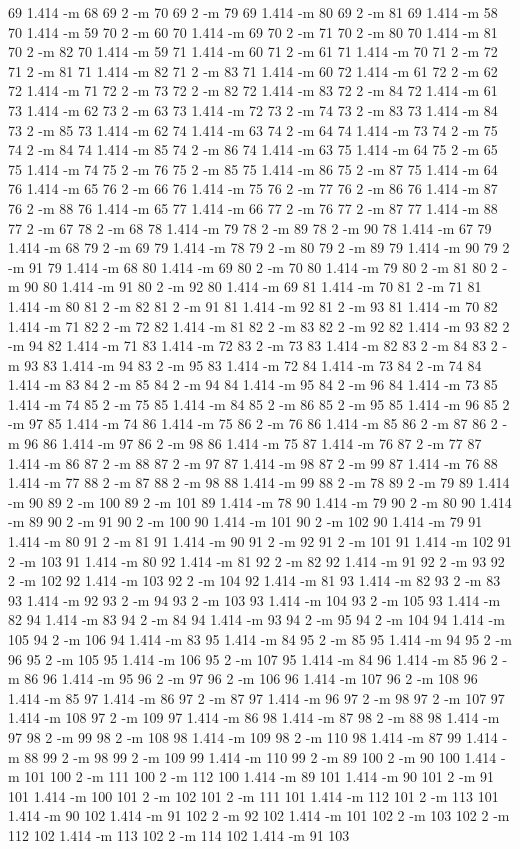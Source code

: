 \documentclass[12pt]{article}
\begin{document}
69 1.414 -m 68 69 2 -m 70 69 2 -m 79 69 1.414 -m 80 69 2 -m 81 69 1.414 -m 58 70 1.414 -m 59 70 2 -m 60 70 1.414 -m 69 70 2 -m 71 70 2 -m 80 70 1.414 -m 81 70 2 -m 82 70 1.414 -m 59 71 1.414 -m 60 71 2 -m 61 71 1.414 -m 70 71 2 -m 72 71 2 -m 81 71 1.414 -m 82 71 2 -m 83 71 1.414 -m 60 72 1.414 -m 61 72 2 -m 62 72 1.414 -m 71 72 2 -m 73 72 2 -m 82 72 1.414 -m 83 72 2 -m 84 72 1.414 -m 61 73 1.414 -m 62 73 2 -m 63 73 1.414 -m 72 73 2 -m 74 73 2 -m 83 73 1.414 -m 84 73 2 -m 85 73 1.414 -m 62 74 1.414 -m 63 74 2 -m 64 74 1.414 -m 73 74 2 -m 75 74 2 -m 84 74 1.414 -m 85 74 2 -m 86 74 1.414 -m 63 75 1.414 -m 64 75 2 -m 65 75 1.414 -m 74 75 2 -m 76 75 2 -m 85 75 1.414 -m 86 75 2 -m 87 75 1.414 -m 64 76 1.414 -m 65 76 2 -m 66 76 1.414 -m 75 76 2 -m 77 76 2 -m 86 76 1.414 -m 87 76 2 -m 88 76 1.414 -m 65 77 1.414 -m 66 77 2 -m 76 77 2 -m 87 77 1.414 -m 88 77 2 -m 67 78 2 -m 68 78 1.414 -m 79 78 2 -m 89 78 2 -m 90 78 1.414 -m 67 79 1.414 -m 68 79 2 -m 69 79 1.414 -m 78 79 2 -m 80 79 2 -m 89 79 1.414 -m 90 79 2 -m 91 79 1.414 -m 68 80 1.414 -m 69 80 2 -m 70 80 1.414 -m 79 80 2 -m 81 80 2 -m 90 80 1.414 -m 91 80 2 -m 92 80 1.414 -m 69 81 1.414 -m 70 81 2 -m 71 81 1.414 -m 80 81 2 -m 82 81 2 -m 91 81 1.414 -m 92 81 2 -m 93 81 1.414 -m 70 82 1.414 -m 71 82 2 -m 72 82 1.414 -m 81 82 2 -m 83 82 2 -m 92 82 1.414 -m 93 82 2 -m 94 82 1.414 -m 71 83 1.414 -m 72 83 2 -m 73 83 1.414 -m 82 83 2 -m 84 83 2 -m 93 83 1.414 -m 94 83 2 -m 95 83 1.414 -m 72 84 1.414 -m 73 84 2 -m 74 84 1.414 -m 83 84 2 -m 85 84 2 -m 94 84 1.414 -m 95 84 2 -m 96 84 1.414 -m 73 85 1.414 -m 74 85 2 -m 75 85 1.414 -m 84 85 2 -m 86 85 2 -m 95 85 1.414 -m 96 85 2 -m 97 85 1.414 -m 74 86 1.414 -m 75 86 2 -m 76 86 1.414 -m 85 86 2 -m 87 86 2 -m 96 86 1.414 -m 97 86 2 -m 98 86 1.414 -m 75 87 1.414 -m 76 87 2 -m 77 87 1.414 -m 86 87 2 -m 88 87 2 -m 97 87 1.414 -m 98 87 2 -m 99 87 1.414 -m 76 88 1.414 -m 77 88 2 -m 87 88 2 -m 98 88 1.414 -m 99 88 2 -m 78 89 2 -m 79 89 1.414 -m 90 89 2 -m 100 89 2 -m 101 89 1.414 -m 78 90 1.414 -m 79 90 2 -m 80 90 1.414 -m 89 90 2 -m 91 90 2 -m 100 90 1.414 -m 101 90 2 -m 102 90 1.414 -m 79 91 1.414 -m 80 91 2 -m 81 91 1.414 -m 90 91 2 -m 92 91 2 -m 101 91 1.414 -m 102 91 2 -m 103 91 1.414 -m 80 92 1.414 -m 81 92 2 -m 82 92 1.414 -m 91 92 2 -m 93 92 2 -m 102 92 1.414 -m 103 92 2 -m 104 92 1.414 -m 81 93 1.414 -m 82 93 2 -m 83 93 1.414 -m 92 93 2 -m 94 93 2 -m 103 93 1.414 -m 104 93 2 -m 105 93 1.414 -m 82 94 1.414 -m 83 94 2 -m 84 94 1.414 -m 93 94 2 -m 95 94 2 -m 104 94 1.414 -m 105 94 2 -m 106 94 1.414 -m 83 95 1.414 -m 84 95 2 -m 85 95 1.414 -m 94 95 2 -m 96 95 2 -m 105 95 1.414 -m 106 95 2 -m 107 95 1.414 -m 84 96 1.414 -m 85 96 2 -m 86 96 1.414 -m 95 96 2 -m 97 96 2 -m 106 96 1.414 -m 107 96 2 -m 108 96 1.414 -m 85 97 1.414 -m 86 97 2 -m 87 97 1.414 -m 96 97 2 -m 98 97 2 -m 107 97 1.414 -m 108 97 2 -m 109 97 1.414 -m 86 98 1.414 -m 87 98 2 -m 88 98 1.414 -m 97 98 2 -m 99 98 2 -m 108 98 1.414 -m 109 98 2 -m 110 98 1.414 -m 87 99 1.414 -m 88 99 2 -m 98 99 2 -m 109 99 1.414 -m 110 99 2 -m 89 100 2 -m 90 100 1.414 -m 101 100 2 -m 111 100 2 -m 112 100 1.414 -m 89 101 1.414 -m 90 101 2 -m 91 101 1.414 -m 100 101 2 -m 102 101 2 -m 111 101 1.414 -m 112 101 2 -m 113 101 1.414 -m 90 102 1.414 -m 91 102 2 -m 92 102 1.414 -m 101 102 2 -m 103 102 2 -m 112 102 1.414 -m 113 102 2 -m 114 102 1.414 -m 91 103 
\end{document}

